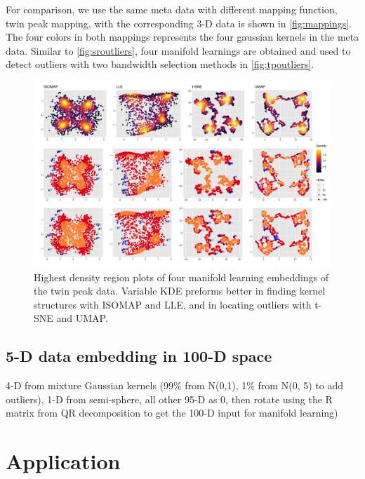 \documentclass[11pt,a4paper,]{article}
\begin{document}
For comparison, we use the same meta data with different mapping function, twin peak mapping, with the corresponding 3-D data is shown in \autoref{fig:mappings}. The four colors in both mappings represents the four gaussian kernels in the meta data. Similar to \autoref{fig:sroutliers}, four manifold learnings are obtained and used to detect outliers with two bandwidth selection methods in \autoref{fig:tpoutliers}.

\begin{figure}

{\centering \includegraphics[width=0.95\linewidth]{figures/twin_peak_outliers_comparison_4ml_3cases} 

}

\caption{Highest density region plots of four manifold learning embeddings of the twin peak data. Variable KDE preforms better in finding kernel structures with ISOMAP and LLE, and in locating outliers with t-SNE and UMAP.}\label{fig:tpoutliers}
\end{figure}

\hypertarget{fivedgaussian}{%
\subsection{5-D data embedding in 100-D space}\label{fivedgaussian}}

4-D from mixture Gaussian kernels (99\% from N(0,1), 1\% from N(0, 5) to add outliers), 1-D from semi-sphere, all other 95-D as 0, then rotate using the R matrix from QR decomposition to get the 100-D input for manifold learning)

\hypertarget{application}{%
\section{Application}\label{application}}
\end{document}
